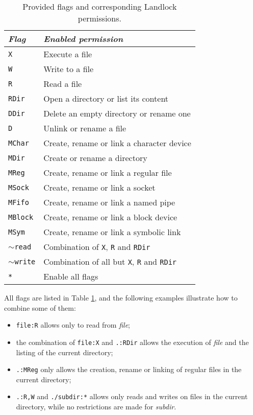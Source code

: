 \begin{table}
  \centering
  \begin{tabular}{|l|l|}
    \hline
    \textit{Flag} & \textit{Enabled permission} \\ \hline\hline
    \texttt{X} & Execute a file \\ \hline
    \texttt{W} & Write to a file \\ \hline
    \texttt{R} & Read a file \\ \hline
    \texttt{RDir} & Open a directory or list its content \\ \hline
    \texttt{DDir} & Delete an empty directory or rename one \\ \hline
    \texttt{D} & Unlink or rename a file \\ \hline
    \texttt{MChar} & Create, rename or link a character device \\ \hline
    \texttt{MDir} & Create or rename a directory \\ \hline
    \texttt{MReg} & Create, rename or link a regular file \\ \hline
    \texttt{MSock} & Create, rename or link a socket \\ \hline
    \texttt{MFifo} & Create, rename or link a named pipe \\ \hline
    \texttt{MBlock} & Create, rename or link a block device \\ \hline
    \texttt{MSym} & Create, rename or link a symbolic link \\ \hline
    \texttt{$\sim$read} & Combination of \texttt{X}, \texttt{R} and \texttt{RDir} \\ \hline
    \texttt{$\sim$write} & Combination of all but \texttt{X}, \texttt{R} and \texttt{RDir} \\ \hline
    \texttt{*} & Enable all flags \\ \hline
  \end{tabular}
  \caption{Provided flags and corresponding Landlock permissions.}
  \label{table:landlock-flags}
\end{table}

All flags are listed in Table \ref{table:landlock-flags}, and the following examples illustrate how to combine some of them:
\begin{itemize}
  \item \texttt{file:R} allows only to read from \textit{file};
  \item the combination of \texttt{file:X} and \texttt{.:RDir} allows the execution of \textit{file} and the listing of the current directory;
  \item \texttt{.:MReg} only allows the creation, rename or linking of regular files in the current directory;
  \item \texttt{.:R,W} and \texttt{./subdir:*} allows only reads and writes on files in the current directory, while no restrictions are
        made for \textit{subdir}.
\end{itemize}

